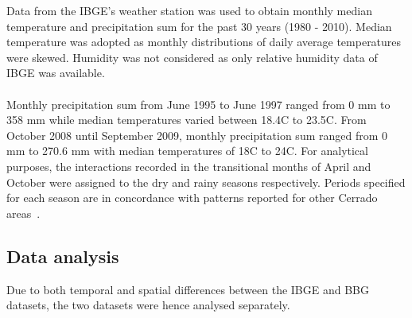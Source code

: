\documentclass[11pt]{article}
\begin{document}
Data from the IBGE's weather station was used to obtain monthly median temperature and precipitation sum for the past 30 years (1980 - 2010). Median temperature was adopted as monthly distributions of daily average temperatures were skewed. Humidity was not considered as only relative humidity data of IBGE was available.\\
\\
Monthly precipitation sum from June 1995 to June 1997 ranged from 0 mm to 358 mm while median temperatures varied between 18.4\degree C to 23.5\degree C. From October 2008 until September 2009, monthly precipitation sum ranged from 0 mm to 270.6 mm with median temperatures of 18\degree C to 24\degree C. For analytical purposes, the interactions recorded in the transitional months of April and October were assigned to the dry and rainy seasons respectively. Periods specified for each season are in concordance with patterns reported for other Cerrado areas~\citep{Gottsberger2006a}. 

\subsection{Data analysis}
Due to both temporal and spatial differences between the IBGE and BBG datasets, the two datasets were hence analysed separately. 
\end{document}
